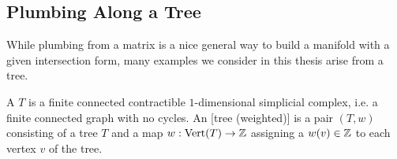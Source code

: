 \subsection{Plumbing Along a Tree}

While plumbing from a matrix is a nice general way to build a manifold with a given intersection form, many examples we consider in this thesis arise from a tree.

\begin{definition}
	A  $T$ is a finite connected contractible $1$-dimensional simplicial complex, i.e. a finite connected graph with no cycles. An [tree (weighted)] is a pair $(T,w)$ consisting of a tree $T$ and a map $w : {\operatorname{Vert}}(T) \to \mathbb{Z}$ assigning a  $w(v)\in \mathbb{Z}$ to each vertex $v$ of the tree.
\end{definition}

